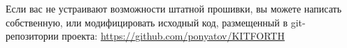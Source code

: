 \label{implement}\secdown

Если вас не устраивают возможности штатной прошивки, вы можете написать
собственную, или модифицировать исходный код, размещенный в git-репозитории
проекта: \url{https://github.com/ponyatov/KITFORTH}








\secup
